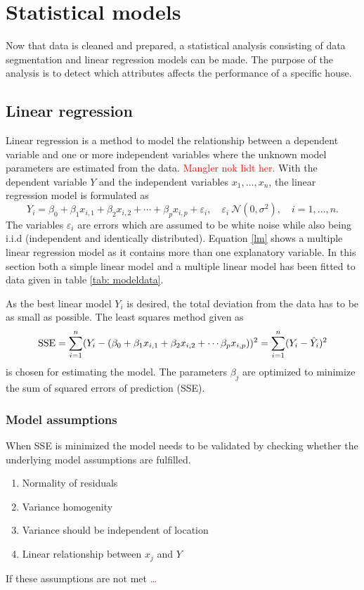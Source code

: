 \chapter{Statistical models}
Now that data is cleaned and prepared, a statistical analysis consisting of data segmentation and linear regression models can be made. The purpose of the analysis is to detect which attributes affects the performance of a specific house. 

\section{Linear regression}
Linear regression is a method to model the relationship between a dependent variable and one or more independent variables where the unknown model parameters are estimated from the data. \textcolor{red}{Mangler nok lidt her.} With the dependent variable $Y$ and the independent variables $x_1, \dots, x_n$, the linear regression model is formulated as 
\begin{equation}
    Y_i = \beta_0 + \beta_1 x_{i,1} + \beta_2 x_{i,2} + \cdots + \beta_p x_{i,p} + \varepsilon_i, \quad \varepsilon_i ~ \mathcal{N}(0,\sigma^2), \quad i = 1,\dots, n. \label{lm}
\end{equation}
The variables $\varepsilon_i$ are errors which are assumed to be white noise while also being i.i.d (independent and identically distributed). Equation \eqref{lm} shows a multiple linear regression model as it contains more than one explanatory variable. In this section both a simple linear model and a multiple linear model has been fitted to data given in table \ref{tab: modeldata}. 

\noindent As the best linear model $Y_i$ is desired, the total deviation from the data has to be as small as possible. The least squares method given as 
\begin{equation}
    \text{SSE} = \sum_{i=1}^n (Y_i - (\beta_0 + \beta_1 x_{i,1} + \beta_2 x_{i,2} + \cdots  \beta_p x_{i,p}))^2 = \sum_{i=1}^n (Y_i - \Hat{Y}_i)^2 
\end{equation} 
is chosen for estimating the model. The parameters $\beta_j$ are optimized to minimize the sum of squared errors of prediction (SSE).

\subsection{Model assumptions}
\noindent When SSE is minimized the model needs to be validated by checking whether the underlying model assumptions are fulfilled. 
\begin{enumerate} [label=\textbf{\arabic*}]
    \item Normality of residuals 
    \item Variance homogenity
    \item Variance should be independent of location
    \item Linear relationship between $x_j$ and $Y$
\end{enumerate}
If these assumptions are not met \textcolor{red}{\dots} \\

